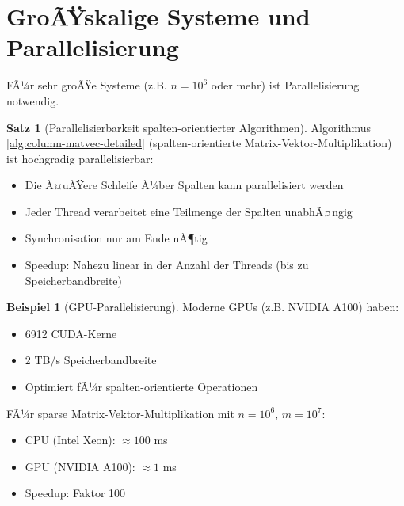 ﻿\documentclass[a4paper,12pt]{report}
\theoremstyle{definition}
\newtheorem{beispiel}{Beispiel}
\newtheorem{satz}{Satz}
\begin{document}
	\section{GroÃŸskalige Systeme und Parallelisierung}
	
	FÃ¼r sehr groÃŸe Systeme (z.B. $n = 10^6$ oder mehr) ist Parallelisierung notwendig.
	
	\begin{satz}[Parallelisierbarkeit spalten-orientierter Algorithmen]
		Algorithmus \ref{alg:column-matvec-detailed} (spalten-orientierte Matrix-Vektor-Multiplikation) ist hochgradig parallelisierbar:
		
		\begin{itemize}
			\item Die Ã¤uÃŸere Schleife Ã¼ber Spalten kann parallelisiert werden
			\item Jeder Thread verarbeitet eine Teilmenge der Spalten unabhÃ¤ngig
			\item Synchronisation nur am Ende nÃ¶tig
			\item Speedup: Nahezu linear in der Anzahl der Threads (bis zu Speicherbandbreite)
		\end{itemize}
	\end{satz}
	
	\begin{beispiel}[GPU-Parallelisierung]
		Moderne GPUs (z.B. NVIDIA A100) haben:
		\begin{itemize}
			\item 6912 CUDA-Kerne
			\item 2 TB/s Speicherbandbreite
			\item Optimiert fÃ¼r spalten-orientierte Operationen
		\end{itemize}
		
		FÃ¼r sparse Matrix-Vektor-Multiplikation mit $n = 10^6$, $m = 10^7$:
		\begin{itemize}
			\item CPU (Intel Xeon): $\approx 100$ ms
			\item GPU (NVIDIA A100): $\approx 1$ ms
			\item Speedup: Faktor 100
		\end{itemize}
	\end{beispiel}
	
\end{document}
